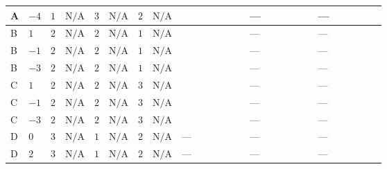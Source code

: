 \documentclass[8pt]{article}
\begin{document}
\begin{landscape}
\begin{longtable}{@{}llcccccc >{\raggedright\arraybackslash}p{0.21\linewidth} >{\raggedright\arraybackslash}p{0.21\linewidth} >{\raggedright\arraybackslash}p{0.21\linewidth}@{}}
\midrule
A & $-4$ & $1$ & $\text{N/A}$ & $3$ & $\text{N/A}$ & $2$ & $\text{N/A}$ & \scriptsize\adjustbox{max width=\linewidth}{$\begin{gathered} +4 {\lambda_{S_1}^{(1)}} {m_1^2}\end{gathered}$} & --- & --- \\
\midrule
B & $1$ & $2$ & $\text{N/A}$ & $2$ & $\text{N/A}$ & $1$ & $\text{N/A}$ & \scriptsize\adjustbox{max width=\linewidth}{$\begin{gathered} +6 {\lambda_{S_1}^{(1)}} {m_1^2}\end{gathered}$} & --- & --- \\
\midrule
B & $-1$ & $2$ & $\text{N/A}$ & $2$ & $\text{N/A}$ & $1$ & $\text{N/A}$ & \scriptsize\adjustbox{max width=\linewidth}{$\begin{gathered} +6 {\lambda_{S_1}^{(1)}} {m_1^2}\end{gathered}$} & --- & --- \\
\midrule
B & $-3$ & $2$ & $\text{N/A}$ & $2$ & $\text{N/A}$ & $1$ & $\text{N/A}$ & \scriptsize\adjustbox{max width=\linewidth}{$\begin{gathered} +6 {\lambda_{S_1}^{(1)}} {m_1^2}\end{gathered}$} & --- & --- \\
\midrule
C & $1$ & $2$ & $\text{N/A}$ & $2$ & $\text{N/A}$ & $3$ & $\text{N/A}$ & \scriptsize\adjustbox{max width=\linewidth}{$\begin{gathered} +6 {\lambda_{S_1}^{(1)}} {m_1^2}\end{gathered}$} & --- & --- \\
\midrule
C & $-1$ & $2$ & $\text{N/A}$ & $2$ & $\text{N/A}$ & $3$ & $\text{N/A}$ & \scriptsize\adjustbox{max width=\linewidth}{$\begin{gathered} +6 {\lambda_{S_1}^{(1)}} {m_1^2}\end{gathered}$} & --- & --- \\
\midrule
C & $-3$ & $2$ & $\text{N/A}$ & $2$ & $\text{N/A}$ & $3$ & $\text{N/A}$ & \scriptsize\adjustbox{max width=\linewidth}{$\begin{gathered} +6 {\lambda_{S_1}^{(1)}} {m_1^2}\end{gathered}$} & --- & --- \\
\midrule
D & $0$ & $3$ & $\text{N/A}$ & $1$ & $\text{N/A}$ & $2$ & $\text{N/A}$ & --- & --- & --- \\
\midrule
D & $2$ & $3$ & $\text{N/A}$ & $1$ & $\text{N/A}$ & $2$ & $\text{N/A}$ & --- & --- & --- \\
\midrule

\end{longtable}
\end{landscape}
\end{document}
